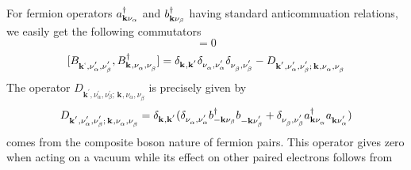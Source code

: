 \documentclass[11pt]{article} %
\begin{document}
For fermion operators $a^{\dagger}_{\mathbf{k}\nu_{\alpha}}$ and $b^{\dagger}_{\mathbf{k}\nu_{\beta}}$ having standard anticommuation relations, we easily get the following commutators
\begin{equation}
[B^{\dg}_{\mathbf{k}^{'},\nu_{\alpha}^{'},\nu_{\beta}^{'}},B^{\dg}_{\mathbf{k}^{ },\nu_{\alpha}^{},\nu_{\beta}^{}}]=0
\end{equation}
\begin{equation}\label{eq:bb}
[B^{}_{\mathbf{k}^{` },\nu_{\alpha}^{'},\nu_{\beta}^{'}},B^{\dagger}_{\mathbf{k}^{ },\nu_{\alpha}^{},\nu_{\beta}^{}}]=
	\delta_{\mathbf{k}^{ },\mathbf{k}^{'}}\delta_{\nu_{\alpha}^{},\nu_{\alpha}^{'}}\delta_{\nu_{\beta}^{},\nu_{\beta}^{'}}-
	D^{}_{\mathbf{k}^{' },\nu_{\alpha}^{'},\nu_{\beta}^{'};\,\mathbf{k}^{ },\nu_{\alpha}^{},\nu_{\beta}^{}}
\end{equation}
The operator $D^{}_{\mathbf{k}^{' },\nu_{\alpha}^{'},\nu_{\beta}^{'};\,\mathbf{k}^{ },\nu_{\alpha}^{},\nu_{\beta}^{}}$ is precisely given by
\begin{equation}
D^{}_{\mathbf{k}^{' },\nu_{\alpha}^{'},\nu_{\beta}^{'};\,\mathbf{k}^{ },\nu_{\alpha}^{},\nu_{\beta}^{}}=
	\delta_{\mathbf{k}^{ },\mathbf{k}^{'}}(\delta_{\nu_{\alpha}^{},\nu_{\alpha}^{'}}b^{\dagger}_{-\mathbf{k}\nu_{\beta}}b^{}_{-\mathbf{k}\nu_{\beta}^{'}}+\delta_{\nu_{\beta}^{},\nu_{\beta}^{'}}a^{\dagger}_{\mathbf{k}\nu_{\alpha}^{}}a^{}_{\mathbf{k}\nu_{\alpha}^{'}})
\end{equation}
comes from the composite boson nature of fermion pairs.  This operator gives zero when acting on a vacuum while its effect on other paired electrons follows from 
\end{document}
